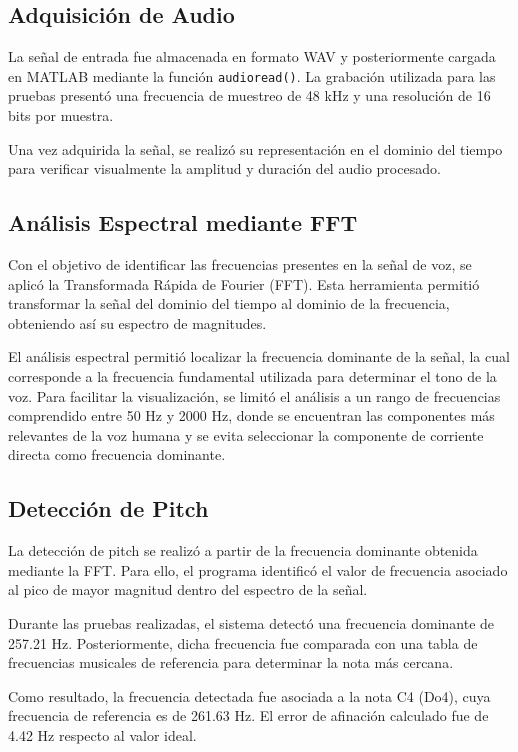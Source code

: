 \documentclass[12pt]{article}
\begin{document}
\subsection{Adquisición de Audio}

La señal de entrada fue almacenada en formato WAV y posteriormente cargada en MATLAB mediante la función \texttt{audioread()}. La grabación utilizada para las pruebas presentó una frecuencia de muestreo de 48 kHz y una resolución de 16 bits por muestra.

Una vez adquirida la señal, se realizó su representación en el dominio del tiempo para verificar visualmente la amplitud y duración del audio procesado.


\subsection{Análisis Espectral mediante FFT}

Con el objetivo de identificar las frecuencias presentes en la señal de voz, se aplicó la Transformada Rápida de Fourier (FFT). Esta herramienta permitió transformar la señal del dominio del tiempo al dominio de la frecuencia, obteniendo así su espectro de magnitudes.

El análisis espectral permitió localizar la frecuencia dominante de la señal, la cual corresponde a la frecuencia fundamental utilizada para determinar el tono de la voz. Para facilitar la visualización, se limitó el análisis a un rango de frecuencias comprendido entre 50 Hz y 2000 Hz, donde se encuentran las componentes más relevantes de la voz humana y se evita seleccionar la componente de corriente directa como frecuencia dominante.


\subsection{Detección de Pitch}

La detección de pitch se realizó a partir de la frecuencia dominante obtenida mediante la FFT. Para ello, el programa identificó el valor de frecuencia asociado al pico de mayor magnitud dentro del espectro de la señal.

Durante las pruebas realizadas, el sistema detectó una frecuencia dominante de 257.21 Hz. Posteriormente, dicha frecuencia fue comparada con una tabla de frecuencias musicales de referencia para determinar la nota más cercana.

Como resultado, la frecuencia detectada fue asociada a la nota C4 (Do4), cuya frecuencia de referencia es de 261.63 Hz. El error de afinación calculado fue de 4.42 Hz respecto al valor ideal.
\end{document}
